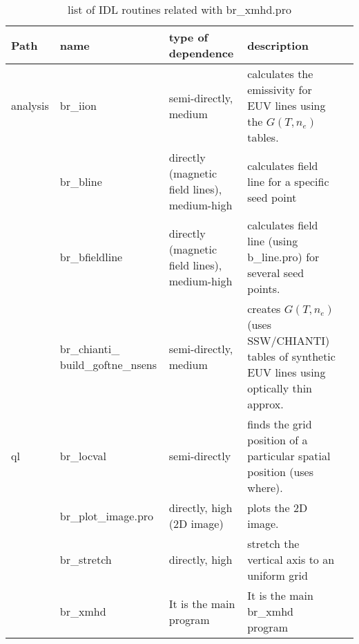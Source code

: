 \documentclass[12pt,preprint]{aastex}
\begin{document}
\clearpage			

\begin{table}[h!]
\caption{list of IDL routines related with br\_xmhd.pro \label{tab:routines}}
\begin{tabular}{ p{1.4cm}|p{4.5cm}|  p{3.3cm}  | p{6cm} l}
Path & name & type of dependence & description \\
\hline
analysis   & br\_iion  & semi-directly, medium  & calculates the emissivity for EUV lines using the
   				$G(T,n_{e})$ tables. \\
   \hline
   & br\_bline & directly (magnetic field lines), medium-high & calculates field line for a 
				 specific seed point \\
   \hline
   & br\_bfieldline & directly (magnetic field lines), medium-high & calculates field line 
   				(using b\_line.pro) for  several seed points.
 \\   \hline
   & br\_chianti\_ build\_goftne\_nsens  & semi-directly, medium & creates $G(T,n_{e})$ (uses SSW/CHIANTI) 
		   		tables of synthetic EUV lines using optically thin approx. \\
\hline               
ql   & br\_locval & semi-directly & finds the grid position of a particular spatial position (uses where).  \\
\hline
   & br\_plot\_image.pro & directly, high (2D image) & plots the 2D image.  \\
   \hline
   & br\_stretch & directly, high & stretch the vertical axis to an uniform grid  \\
   \hline
   & br\_xmhd & It is the main program & It is the main br\_xmhd program  \\
\end{tabular}				
\end{table}
\end{document}
